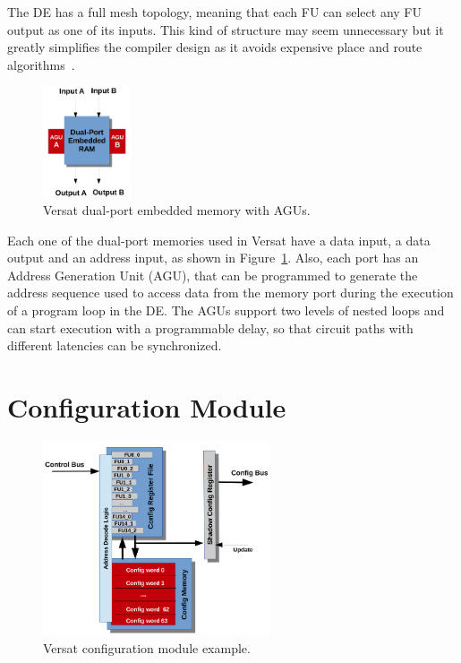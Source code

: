 The DE has a full mesh topology, meaning that each FU can select any FU output
as one of its inputs. This kind of structure may seem unnecessary but it greatly
simplifies the compiler design as it avoids expensive place and route
algorithms~\cite{sousa:versat2016}.

\begin{figure}[!htb]
	\centering
	\includegraphics[width=0.23\textwidth]{Figures/memory.png}
	\caption{Versat dual-port embedded memory with AGUs.}
	\label{fig:memory}
\end{figure}

Each one of the dual-port memories used in Versat have a data input, a data
output and an address input, as shown in Figure~\ref{fig:memory}. Also, each
port has an Address Generation Unit (AGU), that can be programmed to generate
the address sequence used to access data from the memory port during the
execution of a program loop in the DE. The AGUs support two levels of nested
loops and can start execution with a programmable delay, so that circuit paths
with different latencies can be synchronized.

\section{Configuration Module}
\label{section:configuration}

\begin{figure}[!htb]
	\centering
	\includegraphics[width=0.6\textwidth]{Figures/configuration.png}
	\caption{Versat configuration module example.}
	\label{fig:cm}
\end{figure}

